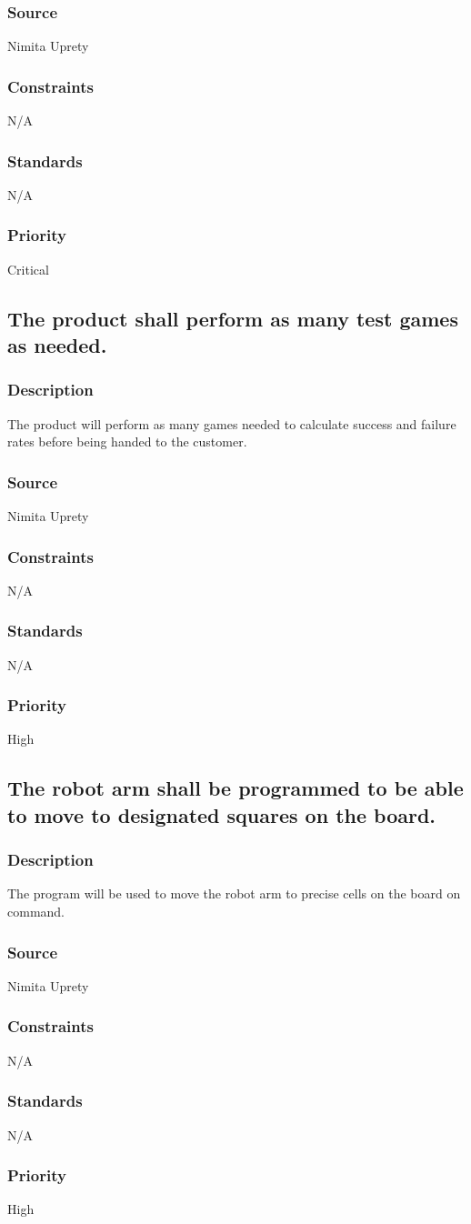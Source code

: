 \subsubsection{Source}
Nimita Uprety
\subsubsection{Constraints}
N/A
\subsubsection{Standards}
N/A
\subsubsection{Priority}
Critical

\subsection{The product shall perform as many test games as needed.}
\subsubsection{Description}
The product will perform as many games needed to calculate success and failure rates before being handed to the customer.
\subsubsection{Source}
Nimita Uprety
\subsubsection{Constraints}
N/A
\subsubsection{Standards}
N/A
\subsubsection{Priority}
High

\subsection{The robot arm shall be programmed to be able to move to designated squares on the board.}
\subsubsection{Description}
The program will be used to move the robot arm to precise cells on the board on command.
\subsubsection{Source}
Nimita Uprety
\subsubsection{Constraints}
N/A
\subsubsection{Standards}
N/A
\subsubsection{Priority}
High